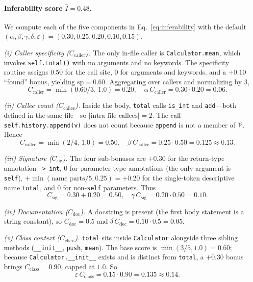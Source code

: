 \paragraph{Inferability score $\hat{I}=0.48$.}
We compute each of the five components in Eq.~\ref{eq:inferability}
with the default
$(\alpha,\beta,\gamma,\delta,\varepsilon)=(0.30,0.25,0.20,0.10,0.15)$.

\emph{(i) Caller specificity ($C_{\mathrm{caller}}$).} The only
in-file caller is \texttt{Calculator.mean}, which invokes
\texttt{self.total()} with no arguments and no keywords. The
specificity routine assigns $0.50$ for the call site, $0$ for
arguments and keywords, and a $+0.10$ ``found'' bonus, yielding
$\mathrm{sp}=0.60$. Aggregating over callers and normalizing by $3$,
%
\[
C_{\mathrm{caller}}=\min(0.60/3,\,1.0)=0.20,
\quad
\alpha\,C_{\mathrm{caller}}=0.30\!\cdot\!0.20=0.06.
\]

\emph{(ii) Callee count ($C_{\mathrm{callee}}$).} Inside the body,
\texttt{total} calls \texttt{is\_int} and \texttt{add}---both defined
in the same file---so $|\text{intra-file callees}|=2$. The call
\texttt{self.history.append(v)} does not count because \texttt{append}
is not a member of $\mathcal{V}$. Hence
%
\[
C_{\mathrm{callee}}=\min(2/4,\,1.0)=0.50,
\quad
\beta\,C_{\mathrm{callee}}=0.25\!\cdot\!0.50=0.125\approx 0.13.
\]

\emph{(iii) Signature ($C_{\mathrm{sig}}$).} The four sub-bonuses are
$+0.30$ for the return-type annotation \texttt{-> int}, $0$ for
parameter type annotations (the only argument is \texttt{self}),
$+\min(\text{name parts}/5,0.25)=+0.20$ for the single-token
descriptive name \texttt{total}, and $0$ for non-\texttt{self}
parameters. Thus
%
\[
C_{\mathrm{sig}}=0.30+0.20=0.50,
\quad
\gamma\,C_{\mathrm{sig}}=0.20\!\cdot\!0.50=0.10.
\]

\emph{(iv) Documentation ($C_{\mathrm{doc}}$).} A docstring is
present (the first body statement is a string constant), so
$C_{\mathrm{doc}}=0.5$ and
$\delta\,C_{\mathrm{doc}}=0.10\!\cdot\!0.5=0.05$.

\emph{(v) Class context ($C_{\mathrm{class}}$).} \texttt{total} sits
inside \texttt{Calculator} alongside three sibling methods
(\texttt{\_\_init\_\_}, \texttt{push}, \texttt{mean}). The base score
is $\min(3/5,1.0)=0.60$; because \texttt{Calculator.\_\_init\_\_}
exists and is distinct from \texttt{total}, a $+0.30$ bonus brings
$C_{\mathrm{class}}=0.90$, capped at $1.0$. So
%
\[
\varepsilon\,C_{\mathrm{class}}=0.15\!\cdot\!0.90=0.135\approx 0.14.
\]


